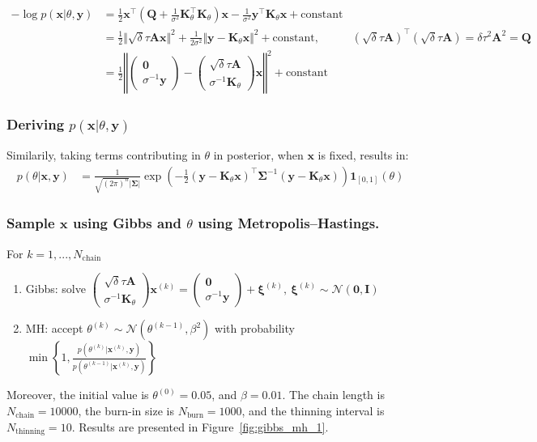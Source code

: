 \documentclass[times, a4paper, 12pt, onecolumn, oneside]{article}
\newcommand{\bm}{\boldsymbol}
\begin{document}
$$
\begin{aligned}
-\log p(\bm{x} | \theta, \bm{y}) &= \frac{1}{2} \bm{x}^\intercal(\bm{Q} + \frac{1}{\sigma^2}\bm{K}_\theta^\intercal \bm{K}_\theta) \bm{x} - \frac{1}{\sigma^2}\bm{y}^\intercal \bm{K}_\theta \bm{x} + \text{constant} \\
&= \frac{1}{2} \Vert \sqrt{\delta}\tau\bm{A} \bm{x} \Vert^2 + \frac{1}{2\sigma^2}\Vert \bm{y} - \bm{K}_\theta \bm{x} \Vert^2 + \text{constant}, & (\sqrt{\delta}\tau\bm{A})^\intercal(\sqrt{\delta}\tau\bm{A}) = \delta\tau^2 \bm{A}^2 = \bm{Q} \\
&= \frac{1}{2} \left\Vert \begin{pmatrix}\bm{0}\\\sigma^{-1}\bm{y}\end{pmatrix} - \begin{pmatrix}\sqrt{\delta}\tau\bm{A}\\\sigma^{-1}\bm{K}_\theta\end{pmatrix}\bm{x} \right\Vert^2 + \text{constant}
\end{aligned}
$$

\subsubsection{Deriving $p(\bm{x} | \theta, \bm{y})$}

Similarily, taking terms contributing in $\theta$ in posterior, when $\bm{x}$ is fixed, results in:
$$
\begin{aligned}
p(\theta | \bm{x}, \bm{y}) &= \frac{1}{\sqrt{(2\pi)^n}\vert\bm{\Sigma}\vert}\exp\left(-\frac{1}{2}(\bm{y} - \bm{K}_\theta \bm{x})^\intercal \bm{\Sigma}^{-1}(\bm{y} - \bm{K}_\theta \bm{x}) \right) \bm{1}_{[0, 1]}(\theta)
\end{aligned}
$$

\subsubsection{Sample $\bm{x}$ using Gibbs and $\theta$ using Metropolis–Hastings.}

For $k=1,...,N_\text{chain}$
\begin{enumerate}
\item Gibbs: solve $\begin{pmatrix}\sqrt{\delta}\tau\bm{A}\\\sigma^{-1}\bm{K}_\theta\end{pmatrix}\bm{x}^{(k)} = \begin{pmatrix}\bm{0}\\\sigma^{-1}\bm{y}\end{pmatrix} + \bm{\xi}^{(k)}, ~ \bm{\xi}^{(k)}\sim\mathcal{N}(\bm{0}, \bm{I})$
\item MH: accept $\theta^{(k)} \sim \mathcal{N}(\theta^{(k-1)}, \beta^2)$ with probability $\min \left\{1, \frac{p(\theta^{(k)} | \bm{x}^{(k)}, \bm{y})}{p(\theta^{(k-1)} | \bm{x}^{(k)}, \bm{y})}\right\}$
\end{enumerate}
Moreover, the initial value is $\theta^{(0)} = 0.05$, and $\beta = 0.01$. The chain length is $N_\text{chain} = 10000$, the burn-in size is $N_\text{burn} = 1000$, and the thinning interval is $N_\text{thinning} = 10$.
Results are presented in Figure~\ref{fig:gibbs_mh_1}.
\end{document}

